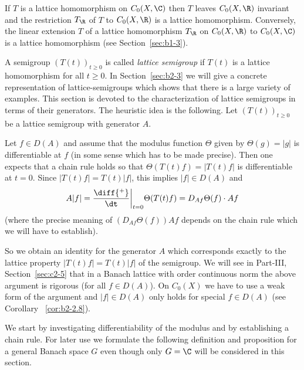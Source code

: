 \begin{remark}\label{rem:b2-2.1}
If\/ $T$ is a lattice homomorphism on $C_{0}(X,\C)$ then $T$ leaves $C_{0}(X,\R)$ invariant and the restriction $T_{\R}$ of\/ $T$ to $C_{0}(X,\R)$ is a lattice homomorphism.
Conversely, the linear extension $T$ of a lattice homomorphism $T_{\R}$ on $C_{0}(X,\R)$ to $C_{0}(X,\C)$ is a lattice homomorphism (see Section~\ref{sec:b1-3}).
\end{remark}

A semigroup $(T(t))_{t \geq 0}$ is called \emph{lattice semigroup} if\/ $T(t)$ is a lattice homomorphism for all $t \geq 0$.
In Section~\ref{sec:b2-3} we will give a concrete representation of lattice-semigroups which shows that there is a large variety of examples.
This section is devoted to the characterization of lattice semigroups in terms of their generators.
The heuristic idea is the following.
Let $(T(t))_{t \geq 0}$ be a lattice semigroup with generator $A$.

Let $f \in D(A)$ and assume that the modulus function $\Theta$ given by $\Theta(g) = |g|$ is differentiable at $f$ (in some sense which has to be made precise).
Then one expects that a chain rule holds so that $\Theta(T(t)f) = |T(t)f|$ is differentiable at $t = 0$.
Since $|T(t)f| = T(t)|f|$, this implies $|f| \in D(A)$ and 
\[
A|f| = \frac{\diff{^{+}}}{\dt}\bigg|_{t=0} \Theta(T(t)f)
     = D_{Af}\Theta(f) \cdot Af
\]
 (where the precise meaning of\/ $(D_{Af}\Theta(f))Af$  
 depends on the chain rule which we will have to establish).
 
So we obtain an identity for the generator $A$ which corresponds exactly to the lattice property $|T(t)f| = T(t)|f|$ of the semigroup.
We will see in Part-III, Section~\ref{sec:c2-5} that in a Banach lattice with order continuous norm the above argument is rigorous (for all $f \in D(A)$).
On $C_{0}(X)$ we have to use a weak form of the argument and $|f| \in D(A)$ only holds for special $f \in D(A)$ (see Corollary ~\ref{cor:b2-2.8}).

We start by investigating differentiability of the modulus and by establishing a chain rule.
For later use we formulate the following definition and proposition for a general Banach space $G$ even though only $G = \C$ will be considered in this section.

